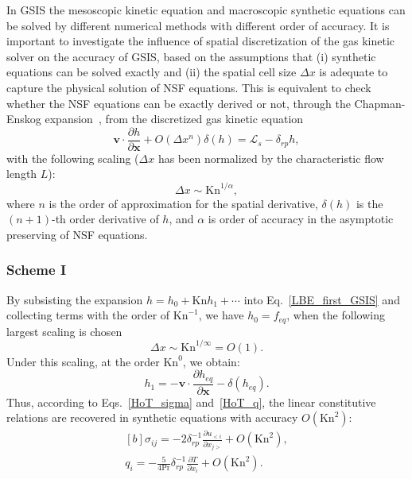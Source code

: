 In GSIS the mesoscopic kinetic equation and macroscopic synthetic equations can be solved by different numerical methods with different order of accuracy. It is important to investigate the influence of spatial discretization of the gas kinetic solver on the accuracy of GSIS, based on the assumptions that (i) synthetic equations can be solved exactly and (ii) the spatial cell size $\Delta{x}$ is adequate to capture the physical solution of NSF equations. This is equivalent to check whether the NSF equations can be exactly derived or not, through the  Chapman-Enskog expansion~\cite{CE}, from the discretized gas kinetic equation 
\begin{equation}\label{LBE_first_GSIS}
\bm{v}\cdot\frac{\partial{h}}{\partial\bm{x}}+O(\Delta{x}^n)\delta(h)=\mathcal{L}_s - \delta_{rp}  h,
\end{equation}
with the following scaling ($\Delta{x}$ has been normalized by the characteristic flow length $L$):
\begin{equation}\label{scaling}
\Delta{x}\sim{\text{Kn}^{1/\alpha}},
\end{equation}
where $n$ is the order of approximation for the spatial derivative,  $\delta(h)$ is the $(n+1)$-th order derivative of $h$, and $\alpha$ is order of accuracy in the asymptotic preserving of NSF equations.  




\subsubsection{Scheme I}



By subsisting the expansion $h=h_0+\text{Kn}h_1+\cdots$ into Eq.~\eqref{LBE_first_GSIS} and collecting terms with the order of $\text{Kn}^{-1}$, we have $h_0=f_{eq}$, when the following largest scaling is chosen
\begin{equation}\label{scaling1}
\Delta{x}\sim{\text{Kn}^{1/\infty}}=O(1).
\end{equation}
Under this scaling, at the order $\text{Kn}^{0}$, we obtain:
\begin{equation}
h_1=-\bm{v}\cdot\frac{\partial{h_{eq}}}{\partial\bm{x}}-\delta(h_{eq}).
\end{equation}
 Thus, according to Eqs.~\eqref{HoT_sigma} and~\eqref{HoT_q},  the linear constitutive relations are recovered in synthetic equations with accuracy $O(\text{Kn}^2)$:
\begin{equation}\label{NSF_relations}
\begin{aligned}[b]
\sigma_{ij} =-2\delta_{rp}^{-1}\frac{\partial u_{<i}}{\partial {x_{j>}}}
+O(\text{Kn}^2), \\
q_i =-\frac{5}{4\text{Pr}}\delta_{rp}^{-1}\frac{\partial T}{\partial x_i}
+O(\text{Kn}^2).
\end{aligned}
\end{equation} 





